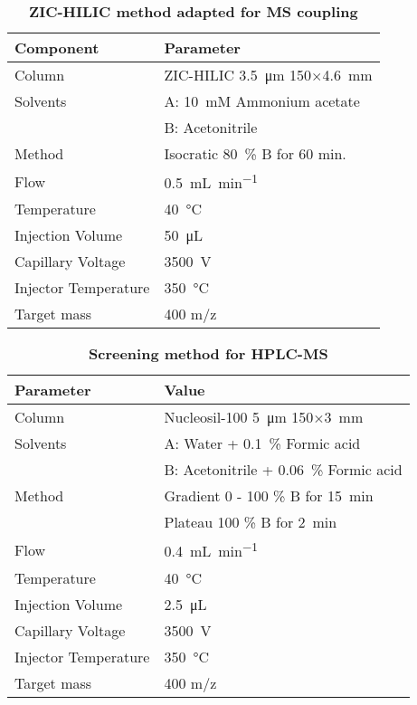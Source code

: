 	\begin{table}[htbp]
		\caption[ZIC-HILIC method adapted for MS coupling]{\textbf{ZIC-HILIC method adapted for MS coupling}}
		\label{tab:method_hilic_ms}
		\centering
		\begin{tabularx}{\textwidth}{XX}
			\toprule
			\textbf{Component}	& \textbf{Parameter}	\\
			\midrule
			Column 		& ZIC-HILIC \SI{3.5}{\micro\meter} 150$\times$\SI{4.6}{\milli\meter} 	\\
			Solvents	& A: 	10~mM Ammonium acetate 	\\
						& B: 	Acetonitrile 			\\
			Method 		& Isocratic 80~\% B for 60 min. 	\\
			Flow 		& \SI{0.5}{\milli\liter\per\minute} \\
			Temperature & \SI{40}{\celsius} 	\\
			Injection Volume 	& \SI{50}{\micro\liter} 	\\
			\midrule
			Capillary Voltage 		& \SI{3500}{\volt} 	\\
			Injector Temperature	& \SI{350}{\celsius}\\
			Target mass 			& 400 m/z 			\\
			\bottomrule
		\end{tabularx}
	\end{table}

	\begin{table}[htbp]
		\caption[Screening method for HPLC-MS]{\textbf{Screening method for HPLC-MS}}
		\label{tab:method_ms_1}
		\centering
		\begin{tabularx}{\textwidth}{XX}
			\toprule
			\textbf{Parameter}	& \textbf{Value}	\\
			\midrule
			Column 		& Nucleosil-100 \SI{5}{\micro\meter} 150$\times$\SI{3}{\milli\meter} 	\\
			Solvents	& A: Water + 0.1~\% Formic acid 	\\
						& B: Acetonitrile + 0.06~\% Formic acid		\\
			Method 		& Gradient 0 - 100 \% B for \SI{15}{\minute} 	\\
						& Plateau 100 \% B for \SI{2}{\minute} 	\\
			Flow 		& \SI{0.4}{\milli\liter\per\minute} \\
			Temperature & \SI{40}{\celsius} 	\\
			Injection Volume 	& \SI{2.5}{\micro\liter} 	\\
			\midrule
			Capillary Voltage 	& \SI{3500}{\volt} 	\\
			Injector Temperature& \SI{350}{\celsius}\\
			Target mass 		& 400 m/z 			\\
			\bottomrule
		\end{tabularx}
	\end{table}

